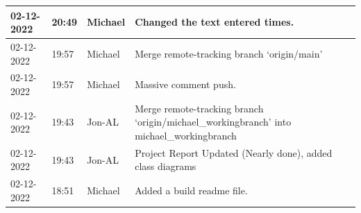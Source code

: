 \documentclass[11pt]{article}
\begin{document}
\begin{center}
\begin{longtable}{|p{2cm}|l|p{2cm}|p{10.5cm}|}
            02-12-2022                                 & 20:49                              & Michael                                 & Changed the text entered times.                                                                                                                                                                                                                                                                              \\ \hline
            02-12-2022                                 & 19:57                              & Michael                                 & Merge remote-tracking branch `origin/main'                                                                                                                                                                                                                                                                   \\ \hline
            02-12-2022                                 & 19:57                              & Michael                                 & Massive comment push.                                                                                                                                                                                                                                                                                        \\ \hline
            02-12-2022                                 & 19:43                              & Jon-AL                                  & Merge remote-tracking branch `origin/michael\_workingbranch' into michael\_workingbranch                                                                                                                                                                                                                     \\ \hline
            02-12-2022                                 & 19:43                              & Jon-AL                                  & Project Report Updated (Nearly done), added class diagrams                                                                                                                                                                                                                                                   \\ \hline
            02-12-2022                                 & 18:51                              & Michael                                 & Added a build readme file.                                                                                                                                                                                                                                                                                   \\ \hline

\end{longtable}
\end{center}
\end{document}
